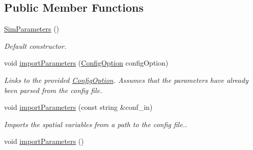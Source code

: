 \subsection*{Public Member Functions}
\begin{DoxyCompactItemize}
\item 
\hyperlink{struct_sim_parameters_aa91bc46ea6909abeeb7488c36da269ee}{Sim\+Parameters} ()\hypertarget{struct_sim_parameters_aa91bc46ea6909abeeb7488c36da269ee}{}\label{struct_sim_parameters_aa91bc46ea6909abeeb7488c36da269ee}

\begin{DoxyCompactList}\small\item\em Default constructor. \end{DoxyCompactList}\item 
void \hyperlink{struct_sim_parameters_a6d39e5ea5b6f6eaa6a7c0fb7d0fd74a7}{import\+Parameters} (\hyperlink{class_config_option}{Config\+Option} config\+Option)
\begin{DoxyCompactList}\small\item\em Links to the provided \hyperlink{class_config_option}{Config\+Option}. Assumes that the parameters have already been parsed from the config file. \end{DoxyCompactList}\item 
void \hyperlink{struct_sim_parameters_a2c587f1f41e13c51696ca24e5edadc96}{import\+Parameters} (const string \&conf\+\_\+in)
\begin{DoxyCompactList}\small\item\em Imports the spatial variables from a path to the config file.. \end{DoxyCompactList}\item 
void \hyperlink{struct_sim_parameters_a65833f22d1f30997727ed71e989af02e}{import\+Parameters} ()\hypertarget{struct_sim_parameters_a65833f22d1f30997727ed71e989af02e}{}\label{struct_sim_parameters_a65833f22d1f30997727ed71e989af02e}


\end{DoxyCompactItemize}
